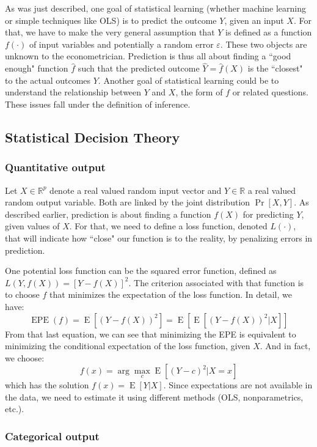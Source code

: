 \documentclass[12pt]{report}
\newcommand{\E}[1]{\operatorname{E}\left[#1\right]}
\newcommand{\Prob}[1]{\operatorname{Pr}\left[#1\right]}
\begin{document}
As was just described, one goal of statistical learning (whether machine learning or simple techniques like OLS) is to predict the outcome $Y$, given an input $X$. For that, we have to make the very general assumption that $Y$ is defined as a function $f(\cdot)$ of input variables and potentially a random error $\varepsilon$. These two objects are unknown to the econometrician. Prediction is thus all about finding a ``good enough" function $\hat f$ such that the predicted outcome $\hat Y = \hat f(X)$ is the ``closest" to the actual outcomes $Y$. Another goal of statistical learning could be to understand the relationship between $Y$ and $X$, the form of $f$ or related questions. These issues fall under the definition of inference.

\subsection{Statistical Decision Theory}

\subsubsection{Quantitative output}

Let $X\in\mathbb{R}^p$ denote a real valued random input vector and $Y\in\mathbb{R}$ a real valued random output variable. Both are linked by the joint distribution $\Prob{X,Y}$. As described earlier, prediction is about finding a function $f(X)$ for predicting $Y$, given values of $X$. For that, we need to define a loss function, denoted $L(\cdot)$, that will indicate how ``close" our function is to the reality, by penalizing errors in prediction.

One potential loss function can be the squared error function, defined as $L(Y, f(X)) = [Y - f(X)]^2$. The criterion associated with that function is to choose $f$ that minimizes the expectation of the loss function. In detail, we have: $$\operatorname{EPE}(f) = \E{\left(Y - f(X)\right)^2} = \E{\E{\left(Y - f(X)\right)^2\vert X}} $$ From that last equation, we can see that minimizing the EPE is equivalent to minimizing the conditional expectation of the loss function, given $X$. And in fact, we choose: $$f(x) = \arg\max_{c} \E{(Y - c)^2\vert X = x} $$ which has the solution $f(x) = \E{Y\vert X}$. Since expectations are not available in the data, we need to estimate it using different methods (OLS, nonparametrics, etc.).

\subsubsection{Categorical output}
\end{document}
